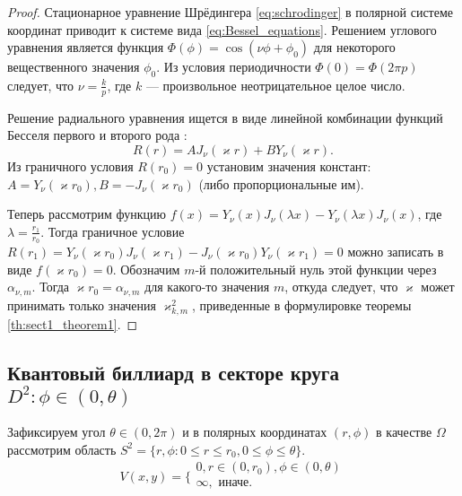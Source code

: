 \begin{proof}
%
Стационарное уравнение Шрёдингера \eqref{eq:schrodinger}   в полярной системе координат приводит к системе вида  \eqref{eq:Bessel_equations}.
Решением углового уравнения  является функция $\Phi(\phi)  = \cos{(\nu \phi + \phi_0)}$ для некоторого вещественного значения $\phi_0$. Из условия периодичности $\Phi(0) = \Phi(2\pi p)$ следует, что 
$\nu = \frac{k}{p}$, где $k$ --- произвольное неотрицательное целое число. 

Решение радиального уравнения ищется в виде линейной  комбинации функций Бесселя первого и второго рода \cite[\S\ 9, с.~358]{wref2}:
$$R(r) = A J_\nu(\varkappa r) +B Y_\nu(\varkappa r).$$
Из граничного условия $R(r_0) = 0$ установим значения констант: $A = Y_\nu(\varkappa r_0), B = -J_\nu(\varkappa r_0)$ (либо пропорциональные им). 

Теперь рассмотрим функцию  $f(x)=Y_\nu(x) J_\nu(\lambda x) - Y_\nu(\lambda x) J_\nu(x)$, где $\lambda = \frac{r_1}{r_0}$.
Тогда граничное условие $R(r_1) = Y_\nu(\varkappa r_0) J_\nu(\varkappa r_1) -J_\nu(\varkappa r_0) Y_\nu(\varkappa r_1) =0$ можно записать в виде
$f(\varkappa r_0)=0$.
Обозначим $m$-й положительный нуль этой функции через $\alpha_{\nu, m}$. Тогда  $\varkappa r_0 = \alpha_{\nu, m} $ для какого-то значения $m$,
откуда следует, что $\varkappa$ может принимать только значения $\varkappa^2_{k,m}$, приведенные в формулировке теоремы \ref{th:sect1_theorem1}.
\end{proof}

\subsection{Квантовый биллиард в секторе круга $D^2: \phi \in (0, \theta)$}\label{sec:ch1/sec1/sub5}
Зафиксируем угол $\theta \in (0, 2\pi)$ и в полярных координатах $(r, \phi)$ в качестве $\Omega$ рассмотрим область 
$S^2 = \{r, \phi : 0 \leq r \leq r_0 , 0 \leq \phi \leq \theta\}$.
\[
    V(x, y) = 
    \Bigg\{
    \begin{array}{cc}
        0, r \in (0, r_0), \phi \in (0, \theta) \\
        \infty, \text{ иначе}.\\
    \end{array}
\] 

